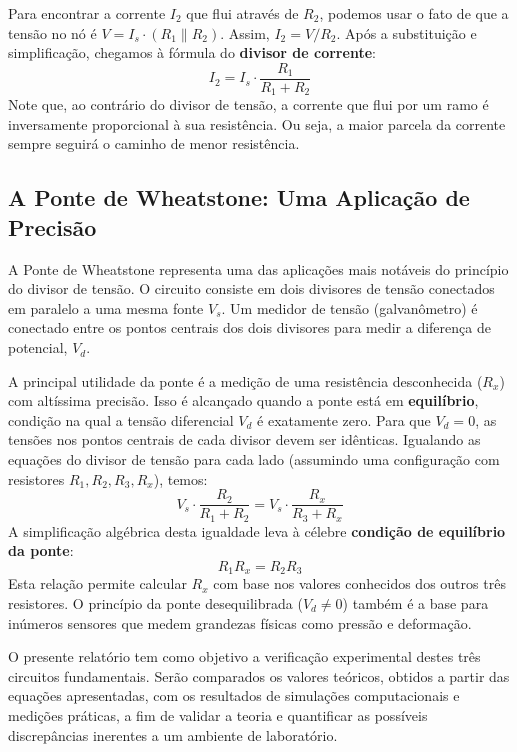 \documentclass[a4paper, 12pt]{article}
\begin{document}
Para encontrar a corrente $I_2$ que flui através de $R_2$, podemos usar o fato de que a tensão no nó é $V = I_s \cdot (R_1 \parallel R_2)$. Assim, $I_2 = V/R_2$. Após a substituição e simplificação, chegamos à fórmula do \textbf{divisor de corrente}:
\begin{equation}
I_2 = I_s \cdot \frac{R_1}{R_1 + R_2}
\label{eq:divisor_corrente}
\end{equation}
Note que, ao contrário do divisor de tensão, a corrente que flui por um ramo é inversamente proporcional à sua resistência. Ou seja, a maior parcela da corrente sempre seguirá o caminho de menor resistência.

\subsection{A Ponte de Wheatstone: Uma Aplicação de Precisão}
A Ponte de Wheatstone representa uma das aplicações mais notáveis do princípio do divisor de tensão. O circuito consiste em dois divisores de tensão conectados em paralelo a uma mesma fonte $V_s$. Um medidor de tensão (galvanômetro) é conectado entre os pontos centrais dos dois divisores para medir a diferença de potencial, $V_d$.

A principal utilidade da ponte é a medição de uma resistência desconhecida ($R_x$) com altíssima precisão. Isso é alcançado quando a ponte está em \textbf{equilíbrio}, condição na qual a tensão diferencial $V_d$ é exatamente zero. Para que $V_d = 0$, as tensões nos pontos centrais de cada divisor devem ser idênticas. Igualando as equações do divisor de tensão para cada lado (assumindo uma configuração com resistores $R_1, R_2, R_3, R_x$), temos:
\[
V_s \cdot \frac{R_2}{R_1 + R_2} = V_s \cdot \frac{R_x}{R_3 + R_x}
\]
A simplificação algébrica desta igualdade leva à célebre \textbf{condição de equilíbrio da ponte}:
\begin{equation}
R_1 R_x = R_2 R_3
\label{eq:ponte_equilibrio}
\end{equation}
Esta relação permite calcular $R_x$ com base nos valores conhecidos dos outros três resistores. O princípio da ponte desequilibrada ($V_d \neq 0$) também é a base para inúmeros sensores que medem grandezas físicas como pressão e deformação.

O presente relatório tem como objetivo a verificação experimental destes três circuitos fundamentais. Serão comparados os valores teóricos, obtidos a partir das equações apresentadas, com os resultados de simulações computacionais e medições práticas, a fim de validar a teoria e quantificar as possíveis discrepâncias inerentes a um ambiente de laboratório.
\end{document}
